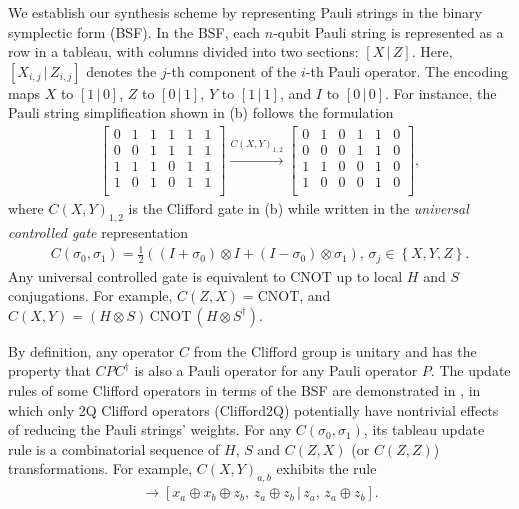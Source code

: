 \documentclass[conference,9pt]{IEEEtran}
\newcommand{\CNOT}{\mathrm{CNOT}}
\begin{document}
    We establish our synthesis scheme by representing Pauli strings in the binary symplectic form (BSF). In the BSF, each $n$-qubit Pauli string is represented as a row in a tableau, with columns divided into two sections: $[X\,|\, Z]$. Here, $[X_{i,j} \,|\, Z_{i,j}]$ denotes the $j$-th component of the $i$-th Pauli operator. The encoding maps $X$ to $[1 \,|\, 0]$, $Z$ to $[0 \,|\, 1]$, $Y$ to $[1 \,|\, 1]$, and $I$ to $[0 \,|\, 0]$. For instance, the Pauli string simplification shown in  (b) follows the formulation
    \begin{align*}
        \left[
            \begin{array}{ccc|ccc}
                0 & 1 & 1 & 1 & 1 & 1\\
                0 & 0 & 1 & 1 & 1 & 1\\
                1 & 1 & 1 & 0 & 1 & 1\\
                1 & 0 & 1 & 0 & 1 & 1\\
            \end{array}
        \right]
        \xrightarrow{C(X,Y)_{1,2}}
        \left[
            \begin{array}{ccc|ccc}
                0 & 1 & 0 & 1 & 1 & 0\\
                0 & 0 & 0 & 1 & 1 & 0\\
                1 & 1 & 0 & 0 & 1 & 0\\
                1 & 0 & 0 & 0 & 1 & 0\\
            \end{array}
        \right],
    \end{align*}
    where $ C(X,Y)_{1,2} $ is the Clifford gate in  (b) while written in the \emph{universal controlled gate} representation
    \begin{align*}
        C(\sigma_0, \sigma_1) = \frac{1}{2}((I + \sigma_0)\otimes I + (I - \sigma_0)\otimes \sigma_1),\, \sigma_j\in \left\{X,Y,Z\right\}.
    \end{align*}
    Any universal controlled gate is equivalent to $ \CNOT $ up to local $ H $ and $ S $ conjugations. For example, $ C(Z,X) = \CNOT$, and $ C(X,Y)  =  (H\otimes S)\, \CNOT\, (H\otimes S^\dagger) $.

    By definition, any operator $ C $ from the Clifford group is unitary and has the property that $ C P C^\dagger $ is also a Pauli operator for any Pauli operator $ P $. The update rules of some Clifford operators in terms of the BSF are demonstrated in , in which only 2Q Clifford operators (Clifford2Q) potentially have nontrivial effects of reducing the Pauli strings' weights. For any $ C(\sigma_0, \sigma_1) $, its tableau update rule is a combinatorial sequence of $ H $, $ S $ and $ C(Z, X) $ (or $ C(Z, Z) $) transformations. For example, $C(X,Y)_{a,b}$ exhibits the rule
    \begin{align}
    [x_a,\, x_b\, |\, z_a,\, z_b] \rightarrow [x_a\oplus x_b\oplus z_b,\, z_a\oplus z_b\, |\, z_a,\, z_a\oplus z_b].
    \end{align}
        
\end{document}
